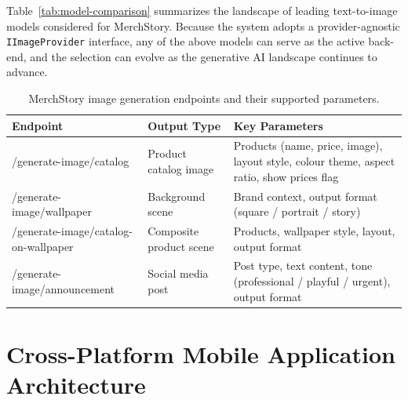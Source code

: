 \documentclass[12pt, a4paper]{report}
\begin{document}
\bigskip\noindent
Table~\ref{tab:model-comparison} summarizes the landscape of leading
text-to-image models considered for MerchStory.  Because the system adopts
a provider-agnostic \texttt{IImageProvider} interface, any of the above
models can serve as the active back-end, and the selection can evolve as the
generative AI landscape continues to advance.

\begin{table}[H]
  \centering
  \footnotesize
  \caption{MerchStory image generation endpoints and their supported parameters.}
  \label{tab:generation-endpoints}
  \begin{tabular}{@{} >{\ttfamily\raggedright\arraybackslash}p{4.4cm}
                       >{\raggedright\arraybackslash}p{3.2cm}
                       >{\raggedright\arraybackslash}p{6.6cm} @{}}
    \toprule
    \normalfont\textbf{Endpoint} & \textbf{Output Type} & \textbf{Key Parameters} \\
    \midrule
    /generate-image/\newline catalog
      & Product catalog image
      & Products (name, price, image), layout style, colour theme, aspect ratio, show prices flag \\[6pt]
    /generate-image/\newline wallpaper
      & Background scene
      & Brand context, output format (square / portrait / story) \\[6pt]
    /generate-image/\newline catalog-on-wallpaper
      & Composite product scene
      & Products, wallpaper style, layout, output format \\[6pt]
    /generate-image/\newline announcement
      & Social media post
      & Post type, text content, tone (professional / playful / urgent), output format \\
    \bottomrule
  \end{tabular}
\end{table}

\section{Cross-Platform Mobile Application Architecture}
\label{sec:mobile-arch}
\end{document}

